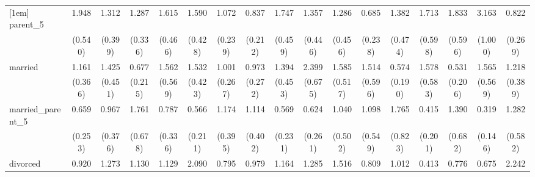 {\begin{tabular}{l*{16}{c}}
[1em]
parent\_5            &       1.948\sym{*}  &       1.312         &       1.287         &       1.615         &       1.590         &       1.072         &       0.837         &       1.747\sym{*}  &       1.357         &       1.286         &       0.685         &       1.382         &       1.713         &       1.833         &       3.163\sym{***}&       0.822         \\
                    &     (0.540)         &     (0.399)         &     (0.336)         &     (0.466)         &     (0.428)         &     (0.239)         &     (0.212)         &     (0.459)         &     (0.446)         &     (0.456)         &     (0.238)         &     (0.474)         &     (0.598)         &     (0.596)         &     (1.000)         &     (0.269)         \\
[1em]
married             &       1.161         &       1.425         &       0.677         &       1.562         &       1.532         &       1.001         &       0.973         &       1.394         &       2.399\sym{**} &       1.585         &       1.514         &       0.574         &       1.578         &       0.531         &       1.565         &       1.218         \\
                    &     (0.366)         &     (0.451)         &     (0.215)         &     (0.569)         &     (0.423)         &     (0.267)         &     (0.272)         &     (0.453)         &     (0.675)         &     (0.517)         &     (0.596)         &     (0.190)         &     (0.583)         &     (0.206)         &     (0.569)         &     (0.389)         \\
[1em]
married\_parent\_5    &       0.659         &       0.967         &       1.761         &       0.787         &       0.566         &       1.174         &       1.114         &       0.569         &       0.624         &       1.040         &       1.098         &       1.765         &       0.415         &       1.390         &       0.319\sym{*}  &       1.282         \\
                    &     (0.253)         &     (0.376)         &     (0.678)         &     (0.336)         &     (0.211)         &     (0.395)         &     (0.402)         &     (0.231)         &     (0.261)         &     (0.502)         &     (0.549)         &     (0.823)         &     (0.201)         &     (0.682)         &     (0.146)         &     (0.582)         \\
[1em]
divorced            &       0.920         &       1.273         &       1.130         &       1.129         &       2.090\sym{*}  &       0.795         &       0.979         &       1.164         &       1.285         &       1.516         &       0.809         &       1.012         &       0.413\sym{*}  &       0.776         &       0.675         &       2.242\sym{*}  \\

\end{tabular}}

